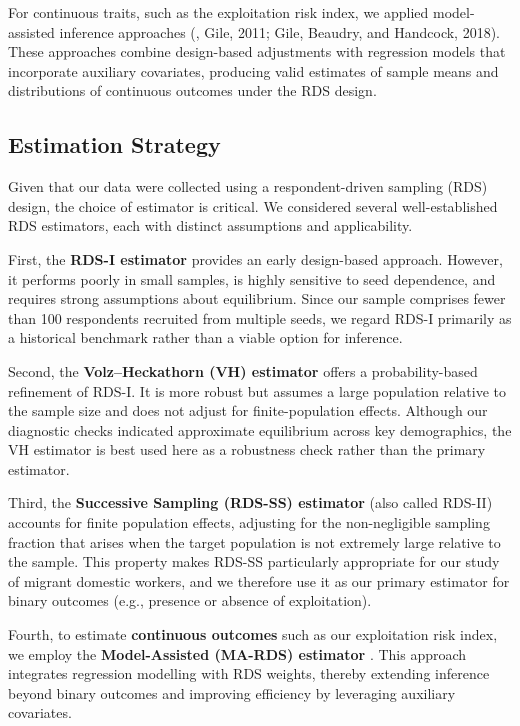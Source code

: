 \documentclass[
  12pt,
  letterpaper,
  DIV=11,
  numbers=noendperiod]{scrartcl}
\theoremstyle{plain}
\theoremstyle{definition}
\begin{document}
For continuous traits, such as the exploitation risk index, we applied
model-assisted inference approaches (\textcite{gile15-network}, Gile,
2011; Gile, Beaudry, and Handcock, 2018). These approaches combine
design-based adjustments with regression models that incorporate
auxiliary covariates, producing valid estimates of sample means and
distributions of continuous outcomes under the RDS design.

\subsection{Estimation Strategy}\label{estimation-strategy}

Given that our data were collected using a respondent-driven sampling
(RDS) design, the choice of estimator is critical. We considered several
well-established RDS estimators, each with distinct assumptions and
applicability.

First, the \textbf{RDS-I estimator} \textcite{salg04-samplin} provides
an early design-based approach. However, it performs poorly in small
samples, is highly sensitive to seed dependence, and requires strong
assumptions about equilibrium. Since our sample comprises fewer than 100
respondents recruited from multiple seeds, we regard RDS-I primarily as
a historical benchmark rather than a viable option for inference.

Second, the \textbf{Volz--Heckathorn (VH) estimator}
\textcite{volz08-probabi} offers a probability-based refinement of
RDS-I. It is more robust but assumes a large population relative to the
sample size and does not adjust for finite-population effects. Although
our diagnostic checks indicated approximate equilibrium across key
demographics, the VH estimator is best used here as a robustness check
rather than the primary estimator.

Third, the \textbf{Successive Sampling (RDS-SS) estimator} (also called
RDS-II) \textcite{gile11-improve} accounts for finite population
effects, adjusting for the non-negligible sampling fraction that arises
when the target population is not extremely large relative to the
sample. This property makes RDS-SS particularly appropriate for our
study of migrant domestic workers, and we therefore use it as our
primary estimator for binary outcomes (e.g., presence or absence of
exploitation).

Fourth, to estimate \textbf{continuous outcomes} such as our
exploitation risk index, we employ the \textbf{Model-Assisted (MA-RDS)
estimator} \textcite{gile15-network}. This approach integrates
regression modelling with RDS weights, thereby extending inference
beyond binary outcomes and improving efficiency by leveraging auxiliary
covariates.
\end{document}
